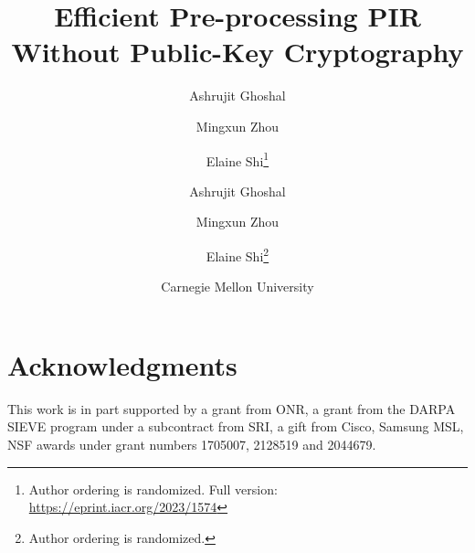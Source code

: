 \documentclass{llncs}
\theoremstyle{plain}
\theoremstyle{definition}
\newcommand{\mingxun}[1]{{\footnotesize\color{magenta}[Mingxun: #1]}}
\renewcommand{\mingxun}[1]{}
\begin{document}
\title{Efficient Pre-processing PIR Without Public-Key Cryptography}





\ifnum{}
\author{Ashrujit Ghoshal \and Mingxun Zhou \and Elaine Shi\thanks{Author ordering is randomized. Full version: \url{https://eprint.iacr.org/2023/1574}}}

% 
\else
    \author{Ashrujit Ghoshal \and Mingxun Zhou \and Elaine Shi\footnote{Author ordering is randomized.}}
    \date{Carnegie Mellon University}
\fi
\maketitle








\begin{abstract}
    \mingxun{Bandwidth or communication?}
    
\end{abstract}















\ifnum{}

% 
\else

% 
\newpage
\fi

\section*{Acknowledgments}
This work is in part supported by a grant from ONR, a grant
from the DARPA SIEVE program under a subcontract from SRI, a gift from Cisco, Samsung MSL,
NSF awards under grant numbers 1705007, 2128519 and 2044679.
\end{document}
